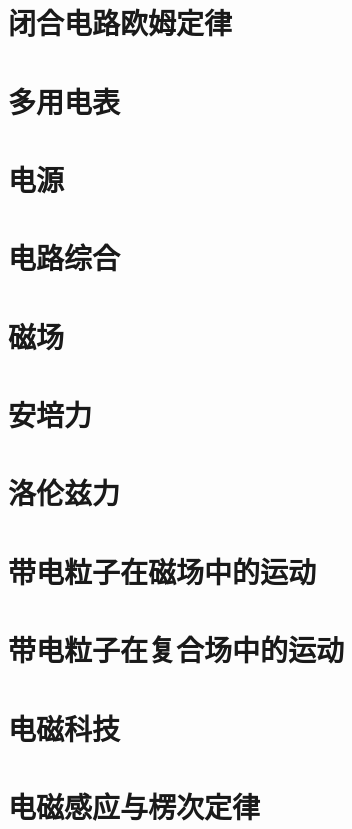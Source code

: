 \documentclass{lesson}
\begin{document}
\section{闭合电路欧姆定律}
\newpage
\section{多用电表}
\newpage
\section{电源}
\newpage
\section{电路综合}
\newpage
\section{磁场}
\newpage
\section{安培力}
\newpage
\section{洛伦兹力}
\newpage
\section{带电粒子在磁场中的运动}
\newpage
\section{带电粒子在复合场中的运动}
\newpage
\section{电磁科技}
\newpage
\section{电磁感应与楞次定律}
\end{document}
